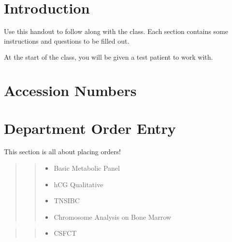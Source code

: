 \setcounter{page}{1}
\section{Introduction}
Use this handout to follow along with the class. Each section contains some instructions and questions to be filled out.

At the start of the class, you will be given a test patient to work with.


\section{Accession Numbers}



\section{Department Order Entry}
This section is all about placing orders!




\begin{quote}
\begin{quote}
    \begin{itemize}
        \item Basic Metabolic Panel
        \item hCG Qualitative
        \item TNSIBC
        \item Chromosome Analysis on Bone Marrow
    \end{itemize}
\end{quote}
\end{quote}


\begin{quote}
\begin{quote}
    \begin{itemize}
        \item CSFCT
    \end{itemize}
\end{quote}
\end{quote}


